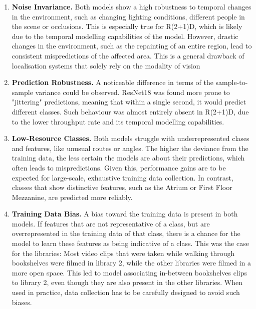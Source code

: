 \documentclass[a4paper]{article}
\begin{document}
\begin{enumerate} 

\item \textbf{Noise Invariance.} Both models show a high robustness to temporal
  changes in the environment, such as changing lighting conditions, different
  people in the scene or occlusions. This is especially true for R(2+1)D, which
  is likely due to the temporal modelling capabilities of the model. However,
  drastic changes in the environment, such as the repainting of an entire
  region, lead to consistent mispredictions of the affected area. This is a
  general drawback of localisation systems that solely rely on the modality of
  vision 

\item \textbf{Prediction Robustness.} A noticeable difference in terms of the
  sample-to-sample variance could be observed. ResNet18 was found more prone to
  "jittering" predictions, meaning that within a single second, it would predict
  different classes. Such behaviour was almost entirely absent in R(2+1)D, due
  to the lower throughput rate and its temporal modelling capabilities.

\item \textbf{Low-Resource Classes.} Both models struggle with underrepresented
  clases and features, like unusual routes or angles. The higher the deviance
  from the training data, the less certain the models are about their
  predictions, which often leads to mispredictions. Given this, performance
  gains are to be expected for large-scale, exhaustive training data collection.
  In contrast, classes that show distinctive features, such as the Atrium or
  First Floor Mezzanine, are predicted more reliably.

\item \textbf{Training Data Bias.} A bias toward the training data is present in
  both models. If features that are not representative of a class, but are
  overrepresented in the training data of that class, there is a chance for the
  model to learn these features as being indicative of a class. This was the
  case for the libraries: Most video clips that were taken while walking through
  bookshelves were filmed in library 2, while the other libraries were filmed in
  a more open space. This led to model associating in-between bookshelves clips
  to library 2, even though they are also present in the other libraries. When
  used in practice, data collection has to be carefully designed to avoid such
  biases.

\end{enumerate}
\end{document}
